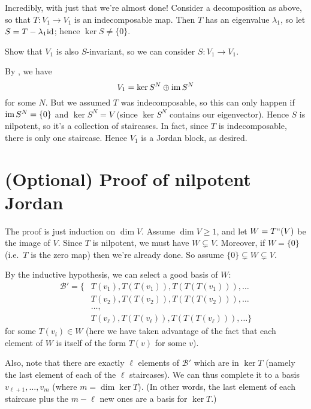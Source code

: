 Incredibly, with just that we're almost done!
Consider a decomposition as above,
so that $T : V_1 \to V_1$ is an indecomposable map.
Then $T$ has an eigenvalue $\lambda_1$, so let $S = T - \lambda_1 \mathrm{id}$; hence $\ker S \neq \{0\}$.
\begin{ques}
	Show that $V_1$ is also $S$-invariant, so we can consider $S : V_1 \to V_1$.
\end{ques}
By , we have
\[ V_1 = \ker S^N \oplus \operatorname{im} S^N \]
for some $N$.
But we assumed $T$ was indecomposable,
so this can only happen if $\operatorname{im} S^N = \{0\}$ and $\ker S^N = V$
(since $\ker S^N$ contains our eigenvector).
Hence $S$ is nilpotent, so it's a collection of staircases.
In fact, since $T$ is indecomposable, there is only one staircase.
Hence $V_1$ is a Jordan block, as desired.

\section{(Optional) Proof of nilpotent Jordan}
The proof is just induction on $\dim V$.
Assume $\dim V \ge 1$, and let $W = T``(V)$ be the image of $V$.
Since $T$ is nilpotent, we must have $W \subsetneq V$.
Moreover, if $W = \{0\}$ (i.e.\ $T$ is the zero map) then we're already done.
So assume $\{0\} \subsetneq W \subsetneq V$.

By the inductive hypothesis, we can select a good basis of $W$:
\begin{align*}
	\mathcal B' =
	\Big\{ & T(v_1), T(T(v_1)), T(T(T(v_1))), \dots \\
	& T(v_2), T(T(v_2)), T(T(T(v_2))), \dots \\
	& \dots, \\
	& T(v_\ell), T(T(v_\ell)), T(T(T(v_\ell))), \dots \Big\}
\end{align*}
for some $T(v_i) \in W$ (here we have taken advantage of the fact that each element of $W$ is itself of the form $T(v)$ for some $v$).

Also, note that there are exactly $\ell$ elements of $\mathcal B'$ which are in $\ker T$
(namely the last element of each of the $\ell$ staircases).
We can thus complete it to a basis $v_{\ell+1}, \dots, v_m$ (where $m = \dim \ker T$).
(In other words, the last element of each staircase plus the $m-\ell$ new ones are a basis for $\ker T$.)

